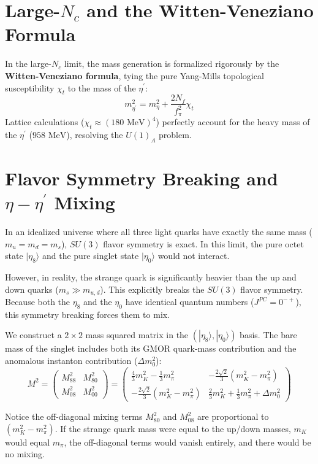 \documentclass[12pt, a4paper]{article}
\begin{document}
\section{Large-$N_c$ and the Witten-Veneziano Formula}

In the large-$N_c$ limit, the mass generation is formalized rigorously by the \textbf{Witten-Veneziano formula}, tying the pure Yang-Mills topological susceptibility $\chi_t$ to the mass of the $\eta^\prime$:
\[
m_{\eta^\prime}^2 = m_\eta^2 + \frac{2 N_f}{f_\pi^2} \chi_t
\]
Lattice calculations ($\chi_t \approx (180 \text{ MeV})^4$) perfectly account for the heavy mass of the $\eta^\prime$ ($958 \text{ MeV}$), resolving the $U(1)_A$ problem.

\section{Flavor Symmetry Breaking and $\eta-\eta^\prime$ Mixing}

In an idealized universe where all three light quarks have exactly the same mass ($m_u = m_d = m_s$), $SU(3)$ flavor symmetry is exact. In this limit, the pure octet state $|\eta_8\rangle$ and the pure singlet state $|\eta_0\rangle$ would not interact.

However, in reality, the strange quark is significantly heavier than the up and down quarks ($m_s \gg m_{u,d}$). This explicitly breaks the $SU(3)$ flavor symmetry. Because both the $\eta_8$ and the $\eta_0$ have identical quantum numbers ($J^{PC} = 0^{-+}$), this symmetry breaking forces them to mix.

We construct a $2 \times 2$ mass squared matrix in the $(|\eta_8\rangle, |\eta_0\rangle)$ basis. The bare mass of the singlet includes both its GMOR quark-mass contribution and the anomalous instanton contribution ($\Delta m_0^2$):
\[
M^2 = \begin{pmatrix} M_{88}^2 & M_{80}^2 \\ M_{08}^2 & M_{00}^2 \end{pmatrix} = \begin{pmatrix} \frac{4}{3}m_K^2 - \frac{1}{3}m_\pi^2 & -\frac{2\sqrt{2}}{3}(m_K^2 - m_\pi^2) \\ -\frac{2\sqrt{2}}{3}(m_K^2 - m_\pi^2) & \frac{2}{3}m_K^2 + \frac{1}{3}m_\pi^2 + \Delta m_0^2 \end{pmatrix}
\]

Notice the off-diagonal mixing terms $M_{80}^2$ and $M_{08}^2$ are proportional to $(m_K^2 - m_\pi^2)$. If the strange quark mass were equal to the up/down masses, $m_K$ would equal $m_\pi$, the off-diagonal terms would vanish entirely, and there would be no mixing.
\end{document}

